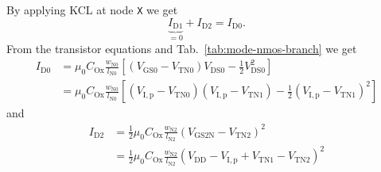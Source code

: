 \documentclass{article}[11pt]
\begin{document}
By applying KCL at node \texttt{X} we get
\begin{equation}\label{eq:kcl-x}
 \underbrace{I_{\mathrm{D1}}}_{=0} + I_{\mathrm{D2}} = I_{\mathrm{D0}}.
\end{equation}
From the transistor equations and Tab.~\ref{tab:mode-nmos-branch} we get
\begin{align}\label{eq:id0}
 I_{\mathrm{D0}} 
 & = \mu_0 C_{\mathrm{Ox}} \frac{w_{\mathrm{N0}}}{l_{\mathrm{N0}}}
     \left[\left(V_{\mathrm{GS0}}-V_{\mathrm{TN0}}\right)V_{\mathrm{DS0}}
           -\frac{1}{2}V_{\mathrm{DS0}}^2\right] \nonumber \\
 & = \mu_0 C_{\mathrm{Ox}} \frac{w_{\mathrm{N0}}}{l_{\mathrm{N0}}}
     \left[\left(V_{\mathrm{I,p}}-V_{\mathrm{TN0}}\right)\left(V_{\mathrm{I,p}}
           - V_{\mathrm{TN1}}\right)-\frac{1}{2}\left(V_{\mathrm{I,p}} 
           - V_{\mathrm{TN1}}\right)^2\right]
\end{align}
and
\begin{align}\label{eq:id2}
 I_{\mathrm{D2}} 
  & = \frac{1}{2} \mu_0 C_{\mathrm{Ox}} \frac{w_{\mathrm{N2}}}{l_{\mathrm{N2}}}
      \left(V_{\mathrm{GS2N}}-V_{\mathrm{TN2}}\right)^2 \nonumber \\
  & = \frac{1}{2} \mu_0 C_{\mathrm{Ox}} \frac{w_{\mathrm{N2}}}{l_{\mathrm{N2}}}
      \left(V_{\mathrm{DD}} - V_{\mathrm{I,p}}
            +V_{\mathrm{TN1}}-V_{\mathrm{TN2}}\right)^2
\end{align}
\end{document}
